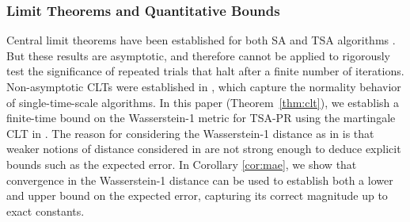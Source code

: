\subsubsection{Limit Theorems and Quantitative Bounds}
Central limit theorems have been established for both SA and TSA algorithms \citep{polyakJuditsky,mokkadem2006convergence,hu2024central}.
But these results are asymptotic, and therefore cannot be applied to rigorously test the significance of repeated trials that halt after a finite number of iterations. 
Non-asymptotic CLTs were established in \citep{anastasiou2019normal,samsonov2024gaussian,srikant2024CLT}, which capture the normality behavior of single-time-scale algorithms.
In this paper (Theorem~\ref{thm:clt}), we establish a finite-time bound on the Wasserstein-1 metric for TSA-PR using the martingale CLT in \citep{srikant2024CLT}. 
The reason for considering the Wasserstein-1 distance as in \citep{srikant2024CLT} is that weaker notions of distance considered in \citep{anastasiou2019normal,samsonov2024gaussian} are not strong enough to deduce explicit bounds such as the expected error.   
In Corollary \ref{cor:mae}, we show that convergence in the Wasserstein-1 distance can be used to establish both a lower and upper bound on the expected error, capturing its correct magnitude up to exact constants.